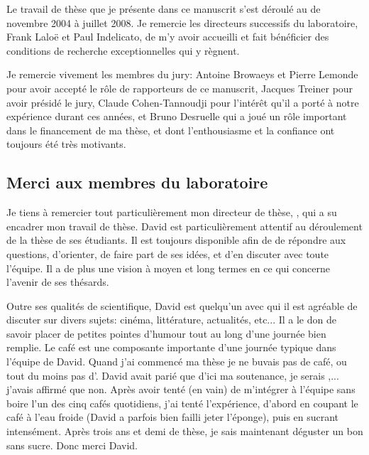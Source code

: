 \begin{ThesisAcknowledgments}

Le travail de thèse que je présente dans ce manuscrit s'est déroulé au  de novembre 2004 à juillet 2008. Je remercie les directeurs successifs du laboratoire, Frank Laloë et Paul Indelicato, de m'y avoir accueilli et fait bénéficier des conditions de recherche exceptionnelles qui y règnent.

Je remercie vivement les membres du jury:
Antoine Browaeys et Pierre Lemonde pour avoir accepté le rôle de rapporteurs de ce manuscrit, 
Jacques Treiner pour avoir présidé le jury,
Claude Cohen-Tannoudji pour l'intérêt qu'il a porté à notre expérience durant ces années,
et Bruno Desruelle qui a joué un rôle important dans le financement de ma thèse, et dont l'enthousiasme et la confiance ont toujours été très motivants. 

 
\subsection*{Merci aux membres du laboratoire}

{\AjouteLigne}


Je tiens à remercier tout particulièrement mon directeur de thèse, \dgo, qui a su encadrer mon travail de thèse. 
David est particulièrement attentif au déroulement de la thèse de ses étudiants. Il est toujours disponible afin de de répondre aux questions, d'orienter, de faire part de ses idées, et d'en discuter avec toute l'équipe. Il a de plus une vision à moyen et long termes en ce qui concerne l'avenir de ses thésards.

Outre ses qualités de scientifique, David est quelqu'un avec qui il est agréable de discuter sur divers sujets: cinéma, littérature, actualités, etc... 
Il a le don de savoir placer de petites pointes d'humour tout au long d'une journée bien remplie.
Le café est une composante importante d'une journée typique dans l'équipe de David.
Quand j'ai commencé ma thèse je ne buvais pas de café, ou tout du moins pas d'. David avait parié que d'ici ma soutenance, je serais ,... j'avais affirmé que {non}. 
Après avoir tenté (en vain) de m'intégrer à l'équipe sans boire l'un des cinq cafés quotidiens, j'ai tenté l'expérience, d'abord en coupant le café à l'eau froide (David a parfois bien failli jeter l'éponge), puis en sucrant intensément. Après trois ans et demi de thèse, je sais maintenant déguster un bon  sans sucre. Donc merci David.



\end{ThesisAcknowledgments}
